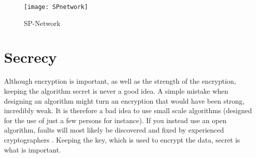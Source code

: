 \begin{figure}
  \begin{center}
    \texttt{[image: SPnetwork]}
    \caption{SP-Network}
    \label{img:SPNetwork}
  \end{center}
\end{figure}


\section{Secrecy}
Although encryption is important, as well as the strength of the encryption, 
keeping the algorithm secret is never a good idea. A simple mistake when 
designing an algorithm might turn an encryption that would have been strong,
incredibly weak. It is therefore a bad idea to use small scale algorithms  
(designed for the use of just a few persons for instance). If you instead 
use an open algorithm, faults will most likely be discovered and fixed by 
experienced cryptographers \citep[pp. 23]{Schneier:2003}. Keeping the key, 
which is used to encrypt the data, secret is what is important.
